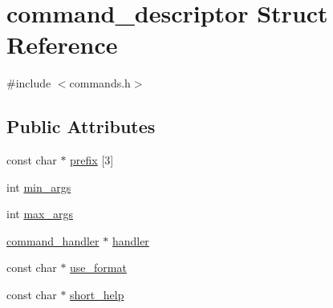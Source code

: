 \hypertarget{structcommand__descriptor}{\section{command\+\_\+descriptor Struct Reference}
\label{structcommand__descriptor}
}


{\ttfamily \#include $<$commands.\+h$>$}

\subsection*{Public Attributes}
\begin{DoxyCompactItemize}
\item 
const char $\ast$ \hyperlink{structcommand__descriptor_a8700eeae6abedd60b5bf2199a84d7cf0}{prefix} \mbox{[}3\mbox{]}
\item 
int \hyperlink{structcommand__descriptor_aae0e62e31c93bfc3d6c1963a2b6752c9}{min\+\_\+args}
\item 
int \hyperlink{structcommand__descriptor_acf2f0d6f9aa089fd8b5747e492e944b2}{max\+\_\+args}
\item 
\hyperlink{commands_8h_a4f73e3beca0296e4da2d4c609b02c5de}{command\+\_\+handler} $\ast$ \hyperlink{structcommand__descriptor_abc53ab6c6c7267ba08b58d8fb05105d3}{handler}
\item 
const char $\ast$ \hyperlink{structcommand__descriptor_a3a8d81c564f70634beebed881d5a1902}{use\+\_\+format}
\item 
const char $\ast$ \hyperlink{structcommand__descriptor_afea1160b3567f96a39a1a2c567312f94}{short\+\_\+help}
\end{DoxyCompactItemize}



